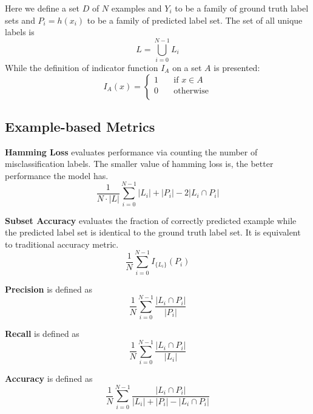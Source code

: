 Here we define a set $D$ of $N$ examples and $Y_{i}$ to be a family of ground truth label sets and $P_{i} = h(x_{i})$ to be a family of predicted label set. The set of all unique labels is
\begin{equation}\label{eq:UniLabel}
L = \bigcup_{i=0}^{N-1} L_{i}
\end{equation}
While the definition of indicator function $I_{A}$ on a set $A$ is presented:
\begin{equation}\label{eq:IndicatorFunc}
I_{A}(x) =
  \begin{cases}
    1       & \quad \text{if } x \in A\\
    0  & \quad \text{otherwise}\\
  \end{cases}
\end{equation}

\subsection{Example-based Metrics}

\textbf{Hamming Loss} evaluates performance via counting the number of misclassification labels. The smaller value of hamming loss is, the better performance the model has.
\begin{equation}\label{eq:HammingLoss}
\frac{1}{N \cdot \left|L\right|} \sum_{i=0}^{N - 1} \left|L_i\right| + \left|P_i\right| - 2\left|L_i
          \cap P_i\right|
\end{equation}

\textbf{Subset Accuracy} evaluates the fraction of correctly predicted example while the predicted label set is identical to the ground truth label set. It is equivalent to traditional accuracy metric.
\begin{equation}\label{eq:SubsetAcu}
\frac{1}{N} \sum_{i=0}^{N-1} I_{\{L_i\}}(P_i)
\end{equation}

\textbf{Precision} is defined as
\begin{equation}\label{eq:Precision}
\frac{1}{N} \sum_{i=0}^{N-1} \frac{\left|L_i \cap P_i\right|}{\left|P_i\right|}
\end{equation}

\textbf{Recall} is defined as
\begin{equation}\label{eq:Recall}
\frac{1}{N} \sum_{i=0}^{N-1} \frac{\left|L_i \cap P_i\right|}{\left|L_i\right|}
\end{equation}

\textbf{Accuracy} is defined as
\begin{equation}\label{eq:Accuracy}
\frac{1}{N} \sum_{i=0}^{N - 1} \frac{\left|L_i \cap P_i \right|}
        {\left|L_i\right| + \left|P_i\right| - \left|L_i \cap P_i \right|}
\end{equation}

